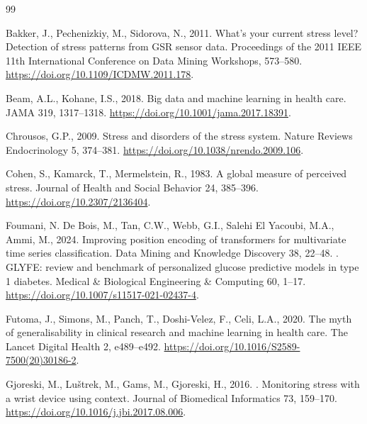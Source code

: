 \documentclass[preprint,12pt,authoryear]{elsarticle}
\providecommand{\DIFaddtex}[1]{{\protect\color{blue} \sf #1}} %
\providecommand{\DIFdeltex}[1]{{\protect\color{red} \scriptsize #1}} %
\providecommand{\DIFaddbegin}{} %
\providecommand{\DIFaddend}{} %
\providecommand{\DIFdelbegin}{} %
\providecommand{\DIFdelend}{} %
\providecommand{\DIFadd}[1]{\texorpdfstring{\DIFaddtex{#1}}{#1}} %
\providecommand{\DIFdel}[1]{\texorpdfstring{\DIFdeltex{#1}}{}} %
\newcommand{\DIFscaledelfig}{0.5}
\newlength{\DIFdelgraphicswidth} %
\newlength{\DIFdelgraphicsheight} %
\newcommand{\DIFaddincludegraphics}[2][]{{\color{blue}\fbox{\DIFOincludegraphics[#1]{#2}}}} %
\newcommand{\DIFdelincludegraphics}[2][]{%
\sbox{\DIFdelgraphicsbox}{\DIFOincludegraphics[#1]{#2}}%
\settoboxwidth{\DIFdelgraphicswidth}{\DIFdelgraphicsbox} %
\settoboxtotalheight{\DIFdelgraphicsheight}{\DIFdelgraphicsbox} %
\scalebox{\DIFscaledelfig}{%
\parbox[b]{\DIFdelgraphicswidth}{\usebox{\DIFdelgraphicsbox}\\[-\baselineskip] \rule{\DIFdelgraphicswidth}{0em}}\llap{\resizebox{\DIFdelgraphicswidth}{\DIFdelgraphicsheight}{%
\setlength{\unitlength}{\DIFdelgraphicswidth}%
\begin{picture}(1,1)%
\thicklines\linethickness{2pt} %
{\color[rgb]{1,0,0}\put(0,0){\framebox(1,1){}}}%
{\color[rgb]{1,0,0}\put(0,0){\line( 1,1){1}}}%
{\color[rgb]{1,0,0}\put(0,1){\line(1,-1){1}}}%
\end{picture}%
}\hspace*{3pt}}} %
} %
\DeclareRobustCommand{\DIFaddbegin}{\DIFOaddbegin \let\includegraphics\DIFaddincludegraphics} %
\DeclareRobustCommand{\DIFaddend}{\DIFOaddend \let\includegraphics\DIFOincludegraphics} %
\DeclareRobustCommand{\DIFdelbegin}{\DIFOdelbegin \let\includegraphics\DIFdelincludegraphics} %
\DeclareRobustCommand{\DIFdelend}{\DIFOaddend \let\includegraphics\DIFOincludegraphics} %
\begin{document}
\DIFaddend %

\begin{thebibliography}{99}

Bakker, J., Pechenizkiy, M., Sidorova, N., 2011.
What's your current stress level? Detection of stress patterns from
GSR sensor data.
Proceedings of the 2011 IEEE 11th International Conference on Data
Mining Workshops, 573--580.
\url{https://doi.org/10.1109/ICDMW.2011.178}.

Beam, A.L., Kohane, I.S., 2018.
Big data and machine learning in health care.
JAMA 319, 1317--1318.
\url{https://doi.org/10.1001/jama.2017.18391}.

Chrousos, G.P., 2009.
Stress and disorders of the stress system.
Nature Reviews Endocrinology 5, 374--381.
\url{https://doi.org/10.1038/nrendo.2009.106}.

Cohen, S., Kamarck, T., Mermelstein, R., 1983.
A global measure of perceived stress.
Journal of Health and Social Behavior 24, 385--396.
\url{https://doi.org/10.2307/2136404}.

\DIFdelbegin {}
\DIFdel{Foumani, N.}\DIFdelend \DIFaddbegin {}
\DIFadd{De Bois, }\DIFaddend M., \DIFdelbegin \DIFdel{Tan, C.W., Webb, G.I., Salehi}\DIFdelend \DIFaddbegin \DIFadd{El Yacoubi, M.A., Ammi}\DIFaddend , M., \DIFdelbegin \DIFdel{2024.
Improving position encoding of transformers for multivariate time series
classification.
Data Mining and Knowledge Discovery 38, 22--48.
}%
\DIFdelend \DIFaddbegin \DIFadd{2022.
GLYFE: review and benchmark of personalized glucose predictive models in
type 1 diabetes.
Medical \& Biological Engineering \& Computing 60, 1--17.
}\url{https://doi.org/10.1007/s11517-021-02437-4}\DIFaddend .

Futoma, J., Simons, M., Panch, T., Doshi-Velez, F., Celi, L.A., 2020.
The myth of generalisability in clinical research and machine learning
in health care.
The Lancet Digital Health 2, e489--e492.
\url{https://doi.org/10.1016/S2589-7500(20)30186-2}.

\DIFdelbegin {}
\DIFdelend \DIFaddbegin {}
\DIFaddend Gjoreski, M., Lu\v{s}trek, M., Gams, M., Gjoreski, H., \DIFdelbegin \DIFdel{2016.
}\DIFdelend \DIFaddbegin \DIFadd{2017.
}\DIFaddend Monitoring stress with a wrist device using context.
Journal of Biomedical Informatics 73, 159--170.
\url{https://doi.org/10.1016/j.jbi.2017.08.006}.


\end{thebibliography}
\end{document}

